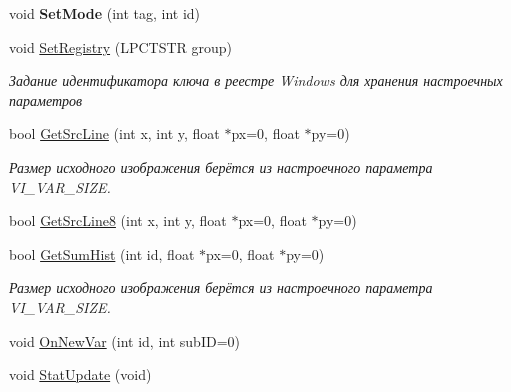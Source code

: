 \begin{DoxyCompactItemize}
\item 
\hypertarget{class_c_v_i_engine_base_a22ba2d068df7651b957bb7cb00a324be}{void {\bfseries Set\+Mode} (int tag, int id)}\label{class_c_v_i_engine_base_a22ba2d068df7651b957bb7cb00a324be}

\item 
void \hyperlink{class_c_v_i_engine_base_a4507f1ddf8b2931693f85e97dafe7cda}{Set\+Registry} (L\+P\+C\+T\+S\+T\+R group)
\begin{DoxyCompactList}\small\item\em Задание идентификатора ключа в реестре Windows для хранения настроечных параметров \end{DoxyCompactList}\item 
bool \hyperlink{class_c_v_i_engine_base_abcb53c55dac3fb076b4e8f5b88e48e6a}{Get\+Src\+Line} (int x, int y, float $\ast$px=0, float $\ast$py=0)
\begin{DoxyCompactList}\small\item\em Размер исходного изображения берётся из настроечного параметра V\+I\+\_\+\+V\+A\+R\+\_\+\+S\+I\+Z\+E. \end{DoxyCompactList}\item 
bool \hyperlink{class_c_v_i_engine_base_aaf9d381d837873e8c66babffa6f6bfd1}{Get\+Src\+Line8} (int x, int y, float $\ast$px=0, float $\ast$py=0)
\item 
bool \hyperlink{class_c_v_i_engine_base_a1e295decbf2fabf485467c2dee1bb51f}{Get\+Sum\+Hist} (int id, float $\ast$px=0, float $\ast$py=0)
\begin{DoxyCompactList}\small\item\em Размер исходного изображения берётся из настроечного параметра V\+I\+\_\+\+V\+A\+R\+\_\+\+S\+I\+Z\+E. \end{DoxyCompactList}\item 
void \hyperlink{class_c_v_i_engine_base_ad6e23a29501fa69951a0cc9405bae96a}{On\+New\+Var} (int id, int sub\+I\+D=0)
\item 
void \hyperlink{class_c_v_i_engine_base_a1fcb2c48c5d0f103dd1e001f8a4ec35f}{Stat\+Update} (void)

\end{DoxyCompactItemize}
